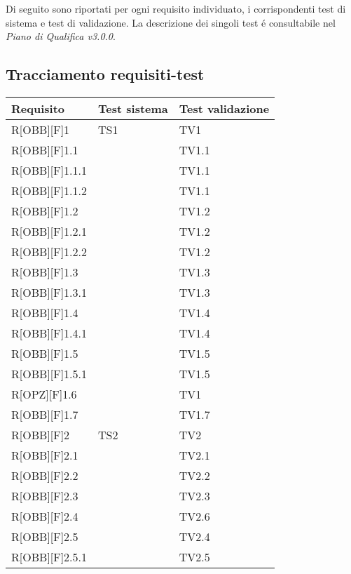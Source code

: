 Di seguito sono riportati per ogni requisito individuato, i corrispondenti test di sistema e test di validazione. La descrizione dei singoli test é consultabile nel \textit{Piano di Qualifica v3.0.0}.
\subsection{Tracciamento requisiti-test}
	\begin{table}[h]
		\begin{tabular}{|p{}|p{}|p{}|}
			\toprule
			
			\textbf{Requisito} & \textbf{Test sistema} & \textbf{Test validazione} \\
			
			\midrule

			R[OBB][F]1 & TS1 & TV1 \\ \midrule
			R[OBB][F]1.1 &  & TV1.1 \\ \midrule
			R[OBB][F]1.1.1 &  & TV1.1 \\ \midrule
			R[OBB][F]1.1.2 &  & TV1.1 \\ \midrule
			R[OBB][F]1.2 &  & TV1.2 \\ \midrule
			R[OBB][F]1.2.1 &  & TV1.2 \\ \midrule
			R[OBB][F]1.2.2 &  & TV1.2 \\ \midrule
			R[OBB][F]1.3 &  & TV1.3 \\ \midrule
			R[OBB][F]1.3.1 &  & TV1.3 \\ \midrule
			R[OBB][F]1.4 &  & TV1.4 \\ \midrule
			R[OBB][F]1.4.1 &  & TV1.4 \\ \midrule
			R[OBB][F]1.5 &  & TV1.5 \\ \midrule
			R[OBB][F]1.5.1 &  & TV1.5 \\ \midrule
			R[OPZ][F]1.6 &  & TV1 \\ \midrule
			R[OBB][F]1.7 &  & TV1.7 \\ \midrule
			R[OBB][F]2 & TS2 & TV2 \\ \midrule
			R[OBB][F]2.1 &  & TV2.1 \\ \midrule
			R[OBB][F]2.2 &  & TV2.2 \\ \midrule
			R[OBB][F]2.3 &  & TV2.3 \\ \midrule
			R[OBB][F]2.4 &  & TV2.6 \\ \midrule
			R[OBB][F]2.5 &  & TV2.4 \\ \midrule
			R[OBB][F]2.5.1 &  & TV2.5 \\ \midrule
	
	\end{tabular}
	\end{table}
	\newpage
	
